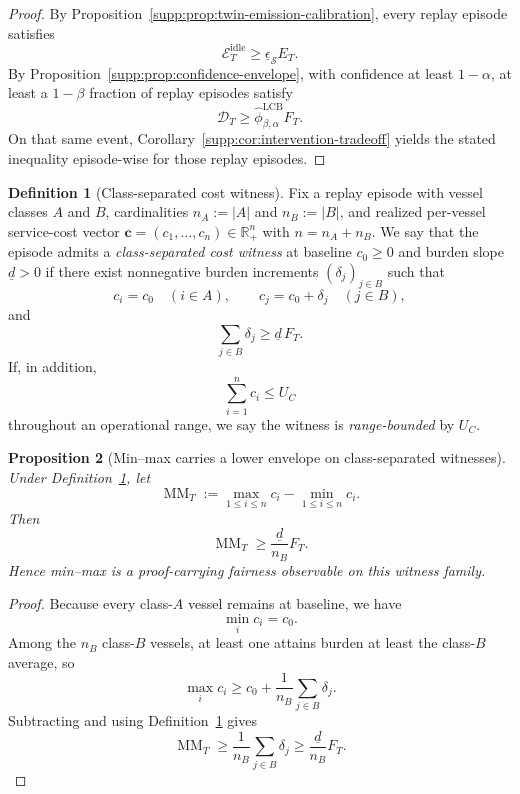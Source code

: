 \documentclass[11pt]{article}
\newcommand{\1}{\mathbf{1}}
\newcommand{\MM}{\operatorname{MM}}
\theoremstyle{definition}
\newtheorem{definition}{Definition}[section]
\theoremstyle{plain}
\newtheorem{proposition}[definition]{Proposition}
\theoremstyle{remark}
\begin{document}
\begin{proof}
By Proposition~\ref{supp:prop:twin-emission-calibration}, every replay episode satisfies
\[
\mathcal E_T^{\mathrm{idle}} \ge \underline\epsilon_{\mathcal S} E_T.
\]
By Proposition~\ref{supp:prop:confidence-envelope}, with confidence at least $1-\alpha$, at least a $1-\beta$ fraction of replay episodes satisfy
\[
\mathcal D_T \ge \widehat\phi^{\mathrm{LCB}}_{\beta,\alpha} F_T.
\]
On that same event, Corollary~\ref{supp:cor:intervention-tradeoff} yields the stated inequality episode-wise for those replay episodes.
\end{proof}

\begin{definition}[Class-separated cost witness]
\label{supp:def:class-separated-witness}
Fix a replay episode with vessel classes $A$ and $B$, cardinalities $n_A:=|A|$ and $n_B:=|B|$, and realized per-vessel service-cost vector $\mathbf c=(c_1,\dots,c_n)\in\mathbb R_+^n$ with $n=n_A+n_B$. We say that the episode admits a \emph{class-separated cost witness} at baseline $c_0\ge 0$ and burden slope $\underline d>0$ if there exist nonnegative burden increments $(\delta_j)_{j\in B}$ such that
\[
c_i = c_0 \quad (i\in A),
\qquad
c_j = c_0 + \delta_j \quad (j\in B),
\]
and
\[
\sum_{j\in B}\delta_j \ge \underline d\,F_T.
\]
If, in addition,
\[
\sum_{i=1}^n c_i \le U_C
\]
throughout an operational range, we say the witness is \emph{range-bounded} by $U_C$.
\end{definition}

\begin{proposition}[Min--max carries a lower envelope on class-separated witnesses]
\label{supp:prop:minmax-envelope}
Under Definition~\ref{supp:def:class-separated-witness}, let
\[
\MM_T := \max_{1\le i\le n} c_i - \min_{1\le i\le n} c_i.
\]
Then
\[
\MM_T \ge \frac{\underline d}{n_B} F_T.
\]
Hence min--max is a proof-carrying fairness observable on this witness family.
\end{proposition}

\begin{proof}
Because every class-$A$ vessel remains at baseline, we have
\[
\min_i c_i = c_0.
\]
Among the $n_B$ class-$B$ vessels, at least one attains burden at least the class-$B$ average, so
\[
\max_i c_i \ge c_0 + \frac{1}{n_B}\sum_{j\in B}\delta_j.
\]
Subtracting and using Definition~\ref{supp:def:class-separated-witness} gives
\[
\MM_T \ge \frac{1}{n_B}\sum_{j\in B}\delta_j \ge \frac{\underline d}{n_B}F_T.
\]
\end{proof}
\end{document}
